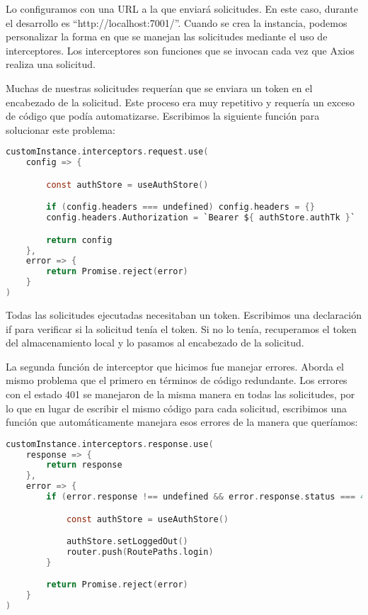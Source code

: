 Lo configuramos con una URL a la que enviará solicitudes. En este caso, durante el desarrollo es ``http://localhost:7001/''. Cuando se crea la instancia, podemos personalizar la forma en que se manejan las solicitudes mediante el uso de interceptores. Los interceptores son funciones que se invocan cada vez que Axios realiza una solicitud.

Muchas de nuestras solicitudes requerían que se enviara un token en el encabezado de la solicitud. Este proceso era muy repetitivo y requería un exceso de código que podía automatizarse. Escribimos la siguiente función para solucionar este problema:

\begin{lstlisting}[language=C,caption={Interceptor de solicitudes de Axios}, label={lst:axios2}]
customInstance.interceptors.request.use(
    config => {

        const authStore = useAuthStore()  

        if (config.headers === undefined) config.headers = {}                               
        config.headers.Authorization = `Bearer ${ authStore.authTk }`      // assign store token to axios configuration

        return config
    },
    error => {
        return Promise.reject(error)
    }
)
\end{lstlisting}

Todas las solicitudes ejecutadas necesitaban un token. Escribimos una declaración if para verificar si la solicitud tenía el token. Si no lo tenía, recuperamos el token del almacenamiento local y lo pasamos al encabezado de la solicitud.


La segunda función de interceptor que hicimos fue manejar errores. Aborda el mismo problema que el primero en términos de código redundante. Los errores con el estado 401 se manejaron de la misma manera en todas las solicitudes, por lo que en lugar de escribir el mismo código para cada solicitud, escribimos una función que automáticamente manejara esos errores de la manera que queríamos:

\begin{lstlisting}[language=C,caption={Interceptor de respuestas de Axios}, label={lst:axios2}]
customInstance.interceptors.response.use(
    response => {
        return response
    },
    error => {
        if (error.response !== undefined && error.response.status === 401) {

            const authStore = useAuthStore()

            authStore.setLoggedOut()
            router.push(RoutePaths.login)
        }

        return Promise.reject(error)
    }
)
\end{lstlisting}

